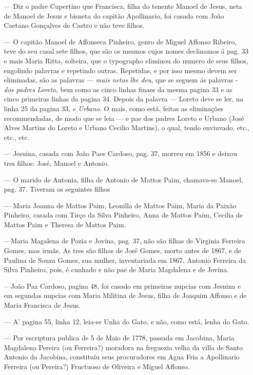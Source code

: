 — Diz o padre Cupertino que Francisca, filha do tenente Manoel de Jesus, neta de Manoel de Jesus e bisneta do capitão Apollinario, foi casada com João Caetano Gonçalves de Castro e não teve filhos.

— O capitão Manoel de Affonseca Pinheiro, genro de Miguel Affonso Ribeiro, teve do seu casal sete filhos, que são os mesmos cujos nomes declinamos á pag. 33 e mais Maria Ritta, solteira, que o typographo eliminou do numero de seus filhos, engolindo palavras e repetindo outras. Repetidas, e por isso mesmo devem ser eliminadas, são as palavras — \textit{mais netos lhe deu}, que se seguem ás palavras - \textit{dos padres Loreto}, bem como as cinco linhas finaes da mesma pagina 33 e as cinco primeiras linhas da pagina 34. Depois da palavra — Loreto deve se ler, na linha 25 da pagina 33, \textit{e Urbano}. O mais, como está, feitas as eliminações recommendadas, de modo que se leia — e pae dos padres Loreto e Urbano (José Alves Martins do Loreto e Urbano Cecilio Martins), o qual, tendo enviuvado, etc., etc., etc.


— Jesuina, casada com João Paes Cardoso, pag. 37, morreu em 1856 e deixou tres filhos: José, Manoel e Antonio.

— O marido de Antonia, filha de Antonio de Mattos Paim, chamava-se Manoel, pag. 37. Tiveram os seguintes filhos 

— Maria Joanna de Mattos Paim, Leonilla de Mattos Paim, Maria da Paixão Pinheiro, casada com Tirço da Silva
Pinheiro, Anna de Mattos Paim, Cecilia de Mattos Paim e Theresa de Mattos Paim.

—Maria Magalena de Pozia e Jovina, pag. 37, não são filhas de Virginia Ferreira Gomes, mas irmãs. As tres são filhas de José Gomes, morto antes de 1867, e de Paulina de Souza Gomes, sua mulher, inventariada em 1867. Antonio Ferreira da Silva Pinheiro, pois, é cunhado e não pae de Maria Magdalena e de Jovina.

—João Paz Cardoso, pagina 48, foi casado em primeiras nupcias com Jesuina e em segundas nupcias com Maria Militina de Jesus, filha de Joaquim Affonso e de Maria Francisca de Jesus.

— A' pagina 55, linha 12, leia-se Unha do Gato, e não, como está, lenha do Gato.

— Por escriptura publica de 5 de Maio de 1778, passada em Jacobina, Maria Magdalena Pereira (ou Ferreira?) moradora na freguezia velha da villa de Santo Antonio da Jacobina, constituíu seus procuradores em Agua Fria a Apollinario Ferreira (ou Pereira?) Fructuoso de Oliveira e Miguel Affonso.

